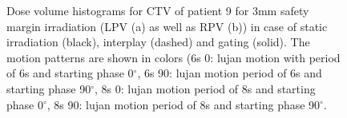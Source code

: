 \newpage


 \begin{figure}[H]
 \begin{center}
\caption{Dose volume histograms for CTV of patient 9 for 3mm safety margin irradiation (LPV (a) as well as RPV (b)) in case of static 
irradiation (black), interplay (dashed) and gating (solid). The motion patterns are shown in colors (6s 0: lujan motion with period of 6s 
and starting phase 0$^{\circ}$, 6s 90: lujan motion period of 6s and starting phase 90$^{\circ}$, 8s 0: lujan motion period of 8s 
and starting phase 0$^{\circ}$, 8s 90: lujan motion period of 8s and starting phase 90$^{\circ}$.}
\label{dvhs_pat09_mdacc}
 \end{center}
\end{figure}

